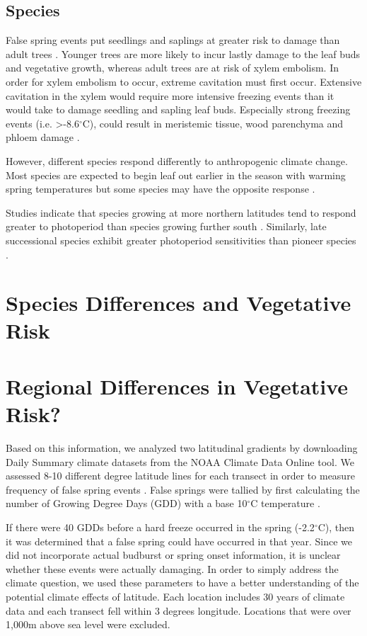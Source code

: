 \documentclass{article}\usepackage[]{graphicx}\usepackage[]{color}
\begin{document}
\subsection*{Species}
False spring events put seedlings and saplings at greater risk to damage than adult trees \citep{Vitasse2014}. Younger trees are more likely to incur lastly damage to the leaf buds and vegetative growth, whereas adult trees are at risk of xylem embolism. In order for xylem embolism to occur, extreme cavitation must first occur. Extensive cavitation in the xylem would require more intensive freezing events than it would take to damage seedling and sapling leaf buds. Especially strong freezing events (i.e. >-8.6$^{\circ}$C), could result in meristemic tissue, wood parenchyma and phloem damage \citep{Lenz2013, Augspurger2011, Sakai1987}.  

However, different species respond differently to anthropogenic climate change. Most species are expected to begin leaf out earlier in the season with warming spring temperatures but some species may have the opposite response \citep{Xin2016, Cleland2006, Yu2010}.

Studies indicate that species growing at more northern latitudes tend to respond greater to photoperiod than species growing further south \citep{Caffarra2011}. Similarly, late successional species exhibit greater photoperiod sensitivities than pioneer species \citep{Basler2012}. 

\section*{Species Differences and Vegetative Risk}

\section*{Regional Differences in Vegetative Risk?}
Based on this information, we analyzed two latitudinal gradients by downloading Daily Summary climate datasets from the NOAA Climate Data Online tool. We assessed 8-10 different degree latitude lines for each transect in order to measure frequency of false spring events \citep{Menne2012, Menne2012b}. False springs were tallied by first calculating the number of Growing Degree Days (GDD) with a base 10$^{\circ}$C temperature \citep{Nugent2005}.

If there were 40 GDDs before a hard freeze occurred in the spring (-2.2$^{\circ}$C), then it was determined that a false spring could have occurred in that year. Since we did not incorporate actual budburst or spring onset information, it is unclear whether these events were actually damaging. In order to simply address the climate question, we used these parameters to have a better understanding of the potential climate effects of latitude.  %
Each location includes 30 years of climate data and each transect fell within 3 degrees longitude. Locations that were over 1,000m above sea level were excluded. 
\end{document}
